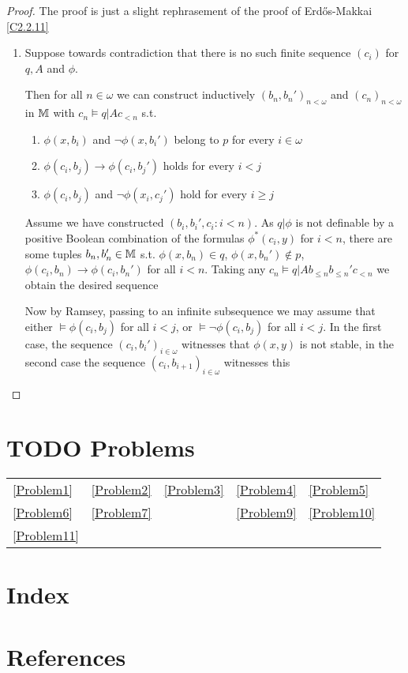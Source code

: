 \documentclass[11pt]{article}
\begin{document}
\begin{proof}
The proof is just a slight rephrasement of the proof of Erdős-Makkai \ref{C2.2.11}

\begin{enumerate}
\item Suppose towards contradiction that there is no such finite sequence \((c_i)\) for \(q,A\)
and \(\phi\).

Then for all \(n\in\omega\) we can construct inductively \((b_n,b_n')_{n<\omega}\) and \((c_n)_{n<\omega}\)
in \(\mathbb{M}\) with \(c_n\vDash q|Ac_{<n}\) s.t.
\begin{enumerate}
\item \(\phi(x,b_i)\) and \(\neg\phi(x,b_i')\)  belong to \(p\) for every \(i\in\omega\)
\item \(\phi(c_i,b_j)\to\phi(c_i,b_j')\) holds for every \(i<j\)
\item \(\phi(c_i,b_j)\) and \(\neg\phi(x_i,c_j')\) hold for every \(i\ge j\)
\end{enumerate}

Assume we have constructed \((b_i,b_i',c_i:i<n)\). As \(q|\phi\) is not definable by a positive
Boolean combination of the formulas \(\phi^*(c_i,y)\) for \(i<n\), there are some
tuples \(b_n,b_n'\in\mathbb{M}\) s.t. \(\phi(x,b_n)\in q\), \(\phi(x,b_n')\notin p\), \(\phi(c_i,b_n)\to\phi(c_i,b_n')\) for
all \(i<n\). Taking any \(c_n\vDash q|Ab_{\le n}b_{\le n}'c_{<n}\) we obtain the desired sequence

Now by Ramsey, passing to an infinite subsequence we may assume that either \(\vDash\phi(c_i,b_j)\)
for all \(i<j\), or \(\vDash\neg\phi(c_i,b_j)\) for all \(i<j\). In the first case, the
sequence \((c_i,b_i')_{i\in\omega}\) witnesses that \(\phi(x,y)\) is not stable, in the second case the
sequence \((c_i,b_{i+1})_{i\in\omega}\) witnesses this
\end{enumerate}
\end{proof}


\section{{\bfseries\sffamily TODO} Problems}
\label{sec:org7b5b678}
\begin{center}
\begin{tabular}{lllll}
\ref{Problem1} & \ref{Problem2} & \ref{Problem3} & \ref{Problem4} & \ref{Problem5}\\
\ref{Problem6} & \ref{Problem7} &  & \ref{Problem9} & \ref{Problem10}\\
\ref{Problem11} &  &  &  & \\
\end{tabular}
\end{center}

\section{Index}
\label{sec:orgbd6da0b}

\renewcommand{\indexname}{}
\printindex

\section{References}
\label{sec:orgc04f2a6}

\label{bibliographystyle link}


\label{bibliography link}

\end{document}

